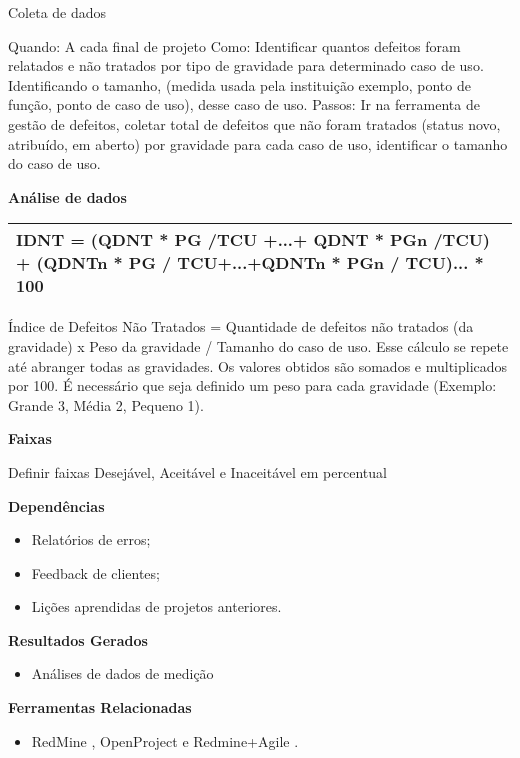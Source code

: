 Coleta de dados

Quando: A cada final de projeto Como: Identificar quantos defeitos foram relatados e não tratados por tipo de gravidade para determinado caso de uso. Identificando o tamanho, (medida usada pela instituição exemplo, ponto de função, ponto de caso de uso), desse caso de uso. Passos: Ir na ferramenta de gestão de defeitos, coletar total de defeitos que não foram tratados (status novo, atribuído, em aberto) por gravidade para cada caso de uso, identificar o tamanho do caso de uso.

\textbf{Análise de dados}

\begin{table}[H]
\centering
\begin{tabular}{|p{130mm}|}
\hline
IDNT = (QDNT * PG /TCU +...+ QDNT * PGn /TCU) + (QDNTn * PG / TCU+...+QDNTn * PGn / TCU)... * 100 \\ 
\hline
\end{tabular}
\end{table}

Índice de Defeitos Não Tratados = Quantidade de defeitos não tratados (da gravidade) x Peso da gravidade / Tamanho do caso de uso. Esse cálculo se repete até abranger todas as gravidades. Os valores obtidos são somados e multiplicados por 100. É necessário que seja definido um peso para cada gravidade (Exemplo: Grande 3, Média 2, Pequeno 1).

\textbf{Faixas}

Definir faixas Desejável, Aceitável e Inaceitável em percentual


\textbf{Dependências}

\begin{itemize}
    \item Relatórios de erros;
    \item Feedback de clientes;
    \item Lições aprendidas de projetos anteriores.
\end{itemize}

\textbf{ Resultados Gerados }
\begin{itemize}
    \item Análises de dados de medição
\end{itemize}

\textbf{ Ferramentas Relacionadas }
\begin{itemize}
    \item RedMine \cite{Redmine}, OpenProject \cite{OpenProject} e Redmine+Agile \cite{RedmineUP}.
\end{itemize}

